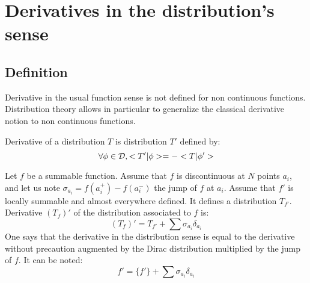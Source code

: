 \documentclass[12pt]{book}
\begin{document}
\section{Derivatives in the distribution's sense}
\subsection{Definition}
Derivative in the usual function
sense is not defined for non continuous functions. Distribution theory allows
in particular to generalize the classical derivative notion to non
continuous functions. 
\begin{defn}
Derivative of a distribution $T$ is distribution $T'$ defined by:
\begin{equation}
\forall \phi \in {\cal D}, <T'|\phi>=-<T|\phi'>
\end{equation}
\end{defn}
\begin{defn}
Let $f$ be a summable function. Assume that $f$ is discontinuous at $N$ points
$a_i$, and let us note
$\sigma_{a_i}=f(a_i^+)-f(a_i^-)$ the jump of $f$ at $a_i$.
Assume that $f'$ is locally summable and almost everywhere defined. It defines
a distribution $T_{f'}$. Derivative $(T_f)'$ of the distribution associated to
$f$ is: 
\begin{equation}
(T_f)'=T_{f'}+\sum \sigma_{a_i} \delta_{a_i}
\end{equation}
One says that the derivative in the distribution sense is equal to the
derivative without precaution augmented by the Dirac distribution multiplied
by the jump of $f$. It can be noted:
\begin{equation}
f'=\{f'\}+\sum \sigma_{a_i} \delta_{a_i}
\end{equation}
\end{defn}
\end{document}
